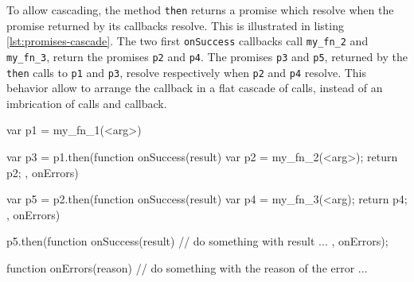 To allow cascading, the method \texttt{then} returns a promise which resolve when the promise returned by its callbacks resolve.
This is illustrated in listing \ref{lst:promises-cascade}.
The two first \texttt{onSuccess} callbacks call \texttt{my\_fn\_2} and \texttt{my\_fn\_3}, return the promises \texttt{p2} and \texttt{p4}.
The promises \texttt{p3} and \texttt{p5}, returned by the \texttt{then} calls to \texttt{p1} and \texttt{p3}, resolve respectively when \texttt{p2} and \texttt{p4} resolve.
This behavior allow to arrange the callback in a flat cascade of calls, instead of an imbrication of calls and callback.

\begin{code}[js, %
             caption={Example of a promise}, %
             label={lst:promises-cascade}] %
var p1 = my_fn_1(<arg>)

var p3 = p1.then(function onSuccess(result) {
  var p2 = my_fn_2(<arg>);
  return p2;
}, onErrors)

var p5 = p2.then(function onSuccess(result) {
  var p4 = my_fn_3(<arg);
  return p4;
}, onErrors)

p5.then(function onSuccess(result) {
  // do something with result ...
}, onErrors);

function onErrors(reason) {
  // do something with the reason of the error ...
}
\end{code}





